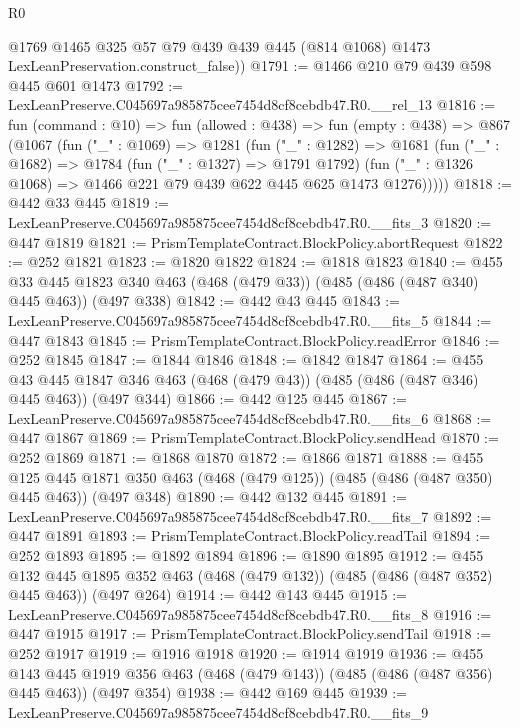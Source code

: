 \begin{lexlean}{R0}
\begin{coremodule}
      @1769
        @1465
        @325
        @57
        @79
        @439
        @439
        @445
        (@814 @1068)
        @1473
        LexLeanPreservation.construct_false))
@1791 := @1466 @210 @79 @439 @598 @445 @601 @1473
@1792 := LexLeanPreserve.C045697a985875cee7454d8cf8cebdb47.R0.__rel_13
@1816 := fun (command : @10) =>
  fun (allowed : @438) =>
  fun (empty : @438) =>
  @867
    (@1067
      (fun ("_" : @1069) =>
      @1281
        (fun ("_" : @1282) =>
        @1681
          (fun ("_" : @1682) =>
          @1784
            (fun ("_" : @1327) => @1791 @1792)
            (fun ("_" : @1326 @1068) => @1466 @221 @79 @439 @622 @445 @625 @1473 @1276)))))
@1818 := @442 @33 @445
@1819 := LexLeanPreserve.C045697a985875cee7454d8cf8cebdb47.R0.__fits_3
@1820 := @447 @1819
@1821 := PrismTemplateContract.BlockPolicy.abortRequest
@1822 := @252 @1821
@1823 := @1820 @1822
@1824 := @1818 @1823
@1840 := @455
    @33
    @445
    @1823
    @340
    @463
    (@468 (@479 @33))
    (@485 (@486 (@487 @340) @445 @463))
    (@497 @338)
@1842 := @442 @43 @445
@1843 := LexLeanPreserve.C045697a985875cee7454d8cf8cebdb47.R0.__fits_5
@1844 := @447 @1843
@1845 := PrismTemplateContract.BlockPolicy.readError
@1846 := @252 @1845
@1847 := @1844 @1846
@1848 := @1842 @1847
@1864 := @455
    @43
    @445
    @1847
    @346
    @463
    (@468 (@479 @43))
    (@485 (@486 (@487 @346) @445 @463))
    (@497 @344)
@1866 := @442 @125 @445
@1867 := LexLeanPreserve.C045697a985875cee7454d8cf8cebdb47.R0.__fits_6
@1868 := @447 @1867
@1869 := PrismTemplateContract.BlockPolicy.sendHead
@1870 := @252 @1869
@1871 := @1868 @1870
@1872 := @1866 @1871
@1888 := @455
    @125
    @445
    @1871
    @350
    @463
    (@468 (@479 @125))
    (@485 (@486 (@487 @350) @445 @463))
    (@497 @348)
@1890 := @442 @132 @445
@1891 := LexLeanPreserve.C045697a985875cee7454d8cf8cebdb47.R0.__fits_7
@1892 := @447 @1891
@1893 := PrismTemplateContract.BlockPolicy.readTail
@1894 := @252 @1893
@1895 := @1892 @1894
@1896 := @1890 @1895
@1912 := @455
    @132
    @445
    @1895
    @352
    @463
    (@468 (@479 @132))
    (@485 (@486 (@487 @352) @445 @463))
    (@497 @264)
@1914 := @442 @143 @445
@1915 := LexLeanPreserve.C045697a985875cee7454d8cf8cebdb47.R0.__fits_8
@1916 := @447 @1915
@1917 := PrismTemplateContract.BlockPolicy.sendTail
@1918 := @252 @1917
@1919 := @1916 @1918
@1920 := @1914 @1919
@1936 := @455
    @143
    @445
    @1919
    @356
    @463
    (@468 (@479 @143))
    (@485 (@486 (@487 @356) @445 @463))
    (@497 @354)
@1938 := @442 @169 @445
@1939 := LexLeanPreserve.C045697a985875cee7454d8cf8cebdb47.R0.__fits_9

\end{coremodule}
\end{lexlean}
